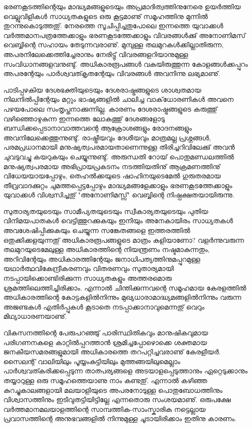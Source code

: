 ഭരണകൂടത്തിന്റെയും മാദ്ധ്യമങ്ങളുടെയും അപ്രമാദിത്വത്തിനുനേരെ ഉയര്‍ത്തിയ വെല്ലുവിളികള്‍ സാധ്യതകളുടെ ഒരു കൂട്ടമാണു് സമൂഹത്തിനു 
മുന്നില്‍ തുറന്നുകൊടുത്തതു്. നേരത്തെ സൂചിപ്പിച്ചതുപോലെ ഇന്നത്തെ യുവാക്കള്‍ വര്‍ത്തമാനപത്രത്തേക്കാളും ഭരണകൂടത്തേക്കാളും 
വിവരങ്ങള്‍ക്കു് അനോണിമസ് വെബ്ബിന്റെ സഹായം തേടുന്നവരാണു്. മുമ്പുള്ള തലമുറകള്‍ക്കില്ലാതിരുന്ന, അപരനിലേക്കെത്തിച്ചേരാനും 
നേരിട്ടു് വിവരങ്ങളറിയാനുമുള്ള സംവിധാനങ്ങളവനുണ്ടു്. അധികാരരൂപങ്ങള്‍ വകയിരുത്തുന്ന കോളങ്ങള്‍ക്കപ്പുറം അപരന്റേയും 
പാര്‍ശ്വവത്കൃതന്റേയും വിവരങ്ങള്‍ അവനിന്നു ലഭ്യമാണു്.

പാടിപ്പഴകിയ ദേശഭക്തിയുടെയും ദേശരാഷ്ട്രങ്ങളുടെ ശാശ്വതമായ നിലനില്‍പ്പിന്റേയും മറ്റും ഭാഷ്യങ്ങളില്‍ ചാലിച്ച വാക്‌ധോരണികള്‍ 
അവനെ പഴയപോലെ സംതൃപ്തനാക്കുന്നില്ല. കാരണം ദേശരാഷ്ട്രങ്ങളുടെ കരുത്തു് വഴിഞ്ഞൊഴുകുന്ന ഇന്നത്തെ ലോകത്തു് 
ദേശങ്ങളോടു ബന്ധിക്കപ്പെടാനാവാത്തവന്റെ ആക്രോശങ്ങളും രോദനങ്ങളും അവനിലേക്കെത്തുന്നുണ്ടു്. രാഷ്ട്രീയവും ദേശീയവും
മാത്രമല്ല പ്രശ്നങ്ങള്‍, പരമപ്രധാനമായി മനുഷ്യത്വപരമായതാണെന്നുള്ള തിരിച്ചറിവിലേക്കു് അവന്‍ ചുവടുവച്ചു കയറുകയും ചെയ്യുന്നുണ്ടു്.
 അരുന്ധതി റോയ് പൊതുമണ്ഡലത്തില്‍ മനുഷ്യത്വപരമായ അഭിപ്രായപ്രകടനം നടത്തിയതിനു് ആക്രമണത്തിനു് വിധേയയായപ്പോഴും, 
തെഹല്‍ക്കയുടെ ഷാഹിനയുടെമേല്‍ ഗുരുതരമായ തീവ്രവാദക്കുറ്റം ചുമത്തപ്പെട്ടപ്പോഴും മാദ്ധ്യമങ്ങളേക്കാളും ഭരണകൂടത്തേക്കാളും 
യുവാക്കള്‍ വിശ്വസിച്ചതു് "അനോണിമസ്സ്" വെബ്ബിന്റെ നിഷ്പക്ഷതയായിരുന്നു.

സുതാര്യതയുടെയും സാമീപ്യതയുടെയും സ്വീകാര്യതയുടെയും പുതിയ വിനിമയപാതകള്‍ വെട്ടിത്തുറക്കുകയും ഇനിയും അനേകായിരം 
സാധ്യതകള്‍ അവശേഷിപ്പിക്കുകയും ചെയ്യുന്ന സങ്കേതങ്ങളെ ഇത്തരത്തില്‍ ഒതുക്കിക്കളയുന്നതു് അധികാരരൂപങ്ങളുടെ മാത്രം 
കളിയാണോ? വളര്‍ന്നുവരുന്ന തലമുറയുടെമേലുള്ള അധികാരത്തിന്റെ നിയന്ത്രണം നഷ്ടമാകുന്നതും, അറിവിന്റേയും അധികാരത്തിന്റേയും
 ജനാധിപത്യത്തിനുമപ്പുറമുള്ള യഥാര്‍ത്ഥവികേന്ദ്രീകരണവും വിതരണവും സുതാര്യമായി നടപ്പായിക്കൊണ്ടിരിക്കുന്ന സാധ്യതകളും 
അത്തരമൊരു ശ്രമത്തിലെത്തിച്ചിരിക്കാം. എന്നാല്‍ ചിന്തിക്കുന്നവന്റെ സമൂഹമായ കേരളത്തില്‍ അധികാരത്തിന്റെ കോട്ടകളില്‍നിന്നും 
മുഖ്യധാരാമാദ്ധ്യമങ്ങളില്‍നിന്നും വരുന്ന അജണ്ടകള്‍ എതിര്‍പ്പുകള്‍ കൂടാതെ നടപ്പാക്കാനാവുമെന്നതു് വെറും മിഥ്യാധാരണയാണു്. ‌

വികസനത്തിന്റെ പേരുപറഞ്ഞു് പാരിസ്ഥിതികവും മാനുഷികവുമായ പരിഗണനകളെ കാറ്റില്‍പ്പറത്താന്‍ ശ്രമിച്ചപ്പോഴൊക്കെ 
ശക്തമായ ജനകീയസമരങ്ങളുമായി അധികാരത്തെ തറപറ്റിച്ചവരാണു് കേരളീയര്‍. സൈലന്റ് വാലിയിലും പൂയ്യംകുട്ടിയിലും
 മുത്തങ്ങയിലുമെല്ലാം പാര്‍ശ്വവത്കരിക്കപ്പെടുന്ന താത്പര്യങ്ങളെ അടയാളപ്പെടുത്താനും ഏറ്റെടുക്കാനും തയ്യാറുള്ള ഒരു 
സമൂഹത്തെയാണു നാം കണ്ടതു്. എന്നാല്‍ കഴിഞ്ഞ കുറച്ചുകാലങ്ങളായി മലയാളിയുടെ അപരനോടുള്ള പൊതുബോധത്തിനും 
വിശ്വാസത്തിനും ഇടിവുതട്ടിയിട്ടില്ലേ എന്നതൊരു സംശയമാണു്. ഒരുപക്ഷേ വര്‍ത്തമാനമലയാളത്തിന്റെ സാമ്പത്തിക-സാംസ്കാരിക 
നട്ടെല്ലായ പ്രവാസത്തിന്റെ അനുഭവങ്ങളില്‍ നിന്നുമുള്ള ചൂടായിരിക്കാം ഇതിനു കാരണം.

